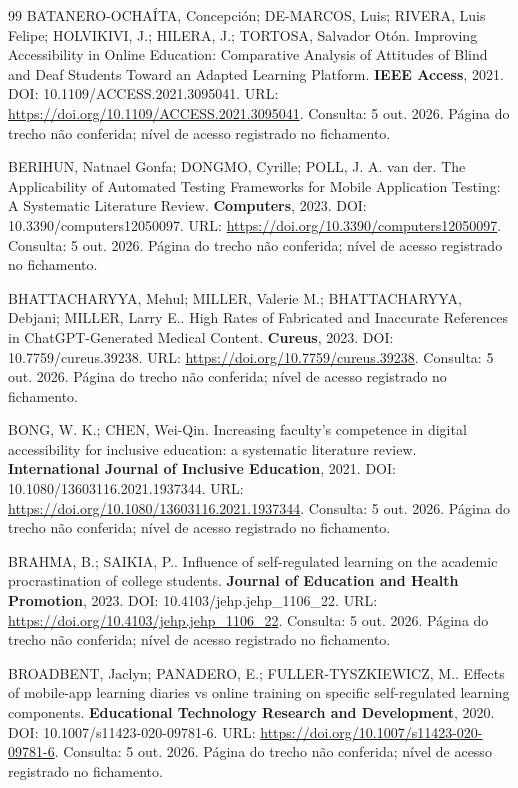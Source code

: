 \begin{thebibliography}{99}
 BATANERO-OCHAÍTA, Concepción; DE-MARCOS, Luis; RIVERA, Luis Felipe; HOLVIKIVI, J.; HILERA, J.; TORTOSA, Salvador Otón. Improving Accessibility in Online Education: Comparative Analysis of Attitudes of Blind and Deaf Students Toward an Adapted Learning Platform. \textbf{IEEE Access}, 2021. DOI: 10.1109/ACCESS.2021.3095041. URL: \url{https://doi.org/10.1109/ACCESS.2021.3095041}. Consulta: 5 out. 2026. Página do trecho não conferida; nível de acesso registrado no fichamento.


 BERIHUN, Natnael Gonfa; DONGMO, Cyrille; POLL, J. A. van der. The Applicability of Automated Testing Frameworks for Mobile Application Testing: A Systematic Literature Review. \textbf{Computers}, 2023. DOI: 10.3390/computers12050097. URL: \url{https://doi.org/10.3390/computers12050097}. Consulta: 5 out. 2026. Página do trecho não conferida; nível de acesso registrado no fichamento.


 BHATTACHARYYA, Mehul; MILLER, Valerie M.; BHATTACHARYYA, Debjani; MILLER, Larry E.. High Rates of Fabricated and Inaccurate References in ChatGPT-Generated Medical Content. \textbf{Cureus}, 2023. DOI: 10.7759/cureus.39238. URL: \url{https://doi.org/10.7759/cureus.39238}. Consulta: 5 out. 2026. Página do trecho não conferida; nível de acesso registrado no fichamento.


 BONG, W. K.; CHEN, Wei-Qin. Increasing faculty’s competence in digital accessibility for inclusive education: a systematic literature review. \textbf{International Journal of Inclusive Education}, 2021. DOI: 10.1080/13603116.2021.1937344. URL: \url{https://doi.org/10.1080/13603116.2021.1937344}. Consulta: 5 out. 2026. Página do trecho não conferida; nível de acesso registrado no fichamento.


 BRAHMA, B.; SAIKIA, P.. Influence of self-regulated learning on the academic procrastination of college students. \textbf{Journal of Education and Health Promotion}, 2023. DOI: 10.4103/jehp.jehp\_1106\_22. URL: \url{https://doi.org/10.4103/jehp.jehp_1106_22}. Consulta: 5 out. 2026. Página do trecho não conferida; nível de acesso registrado no fichamento.


 BROADBENT, Jaclyn; PANADERO, E.; FULLER-TYSZKIEWICZ, M.. Effects of mobile-app learning diaries vs online training on specific self-regulated learning components. \textbf{Educational Technology Research and Development}, 2020. DOI: 10.1007/s11423-020-09781-6. URL: \url{https://doi.org/10.1007/s11423-020-09781-6}. Consulta: 5 out. 2026. Página do trecho não conferida; nível de acesso registrado no fichamento.



\end{thebibliography}
